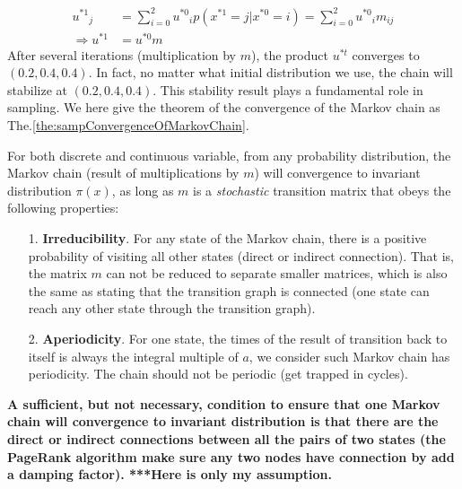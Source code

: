 \documentclass[runningheads,openany]{xhlPaper}
\begin{document}
\begin{equation}
\label{equ:sampMarkovNextTimeProbability}
\begin{aligned}
{u^{*1}}_j &= \sum\limits_{i = 0}^2 {{u^{*0}}_ip\left( {{x^{*1}} = j|{x^{*0}} = i} \right)}  = \sum\limits_{i = 0}^2 {{u^{*0}}_i{m_{ij}}} \\
 \Rightarrow {u^{*1}} &= {u^{*0}}m
\end{aligned}
\end{equation}
After several iterations (multiplication by $m$), the product $u^{*t}$ converges to $\left(0.2, 0.4, 0.4\right)$. 
In fact, no matter what initial distribution we use, the chain will stabilize at $\left(0.2, 0.4, 0.4\right)$. This stability result plays a fundamental role in sampling.
We here give the theorem of the convergence of the Markov chain as The.\ref{the:sampConvergenceOfMarkovChain}.

\begin{theorem}
\label{the:sampConvergenceOfMarkovChain}
For both discrete and continuous variable, from any probability distribution, the Markov chain (result of multiplications by $m$) will convergence to invariant distribution $\pi \left(x\right)$, as long as $m$ is a \emph{stochastic} transition matrix that obeys the following properties:

\begin{itemize}
\item [1.] \textbf{Irreducibility}. For any state of the Markov chain, there is a positive probability of visiting all other states (direct or indirect connection). That is, the matrix $m$ can not be reduced to separate smaller matrices, which is also the same as stating that the transition graph is connected (one state can reach any other state through the transition graph).
\item[2.] \textbf{Aperiodicity}. For one state, the times of the result of transition back to itself is always the integral multiple of $a$, we consider such Markov chain has periodicity. The chain should not be periodic (get trapped in cycles). 
\end{itemize}
\end{theorem}

\textbf{A sufficient, but not necessary, condition to ensure that one Markov chain will convergence to invariant distribution is that there are the direct or indirect connections between all the pairs of two states (the PageRank algorithm make sure any two nodes have connection by add a damping factor). 
***Here is only my assumption.}
\end{document}
